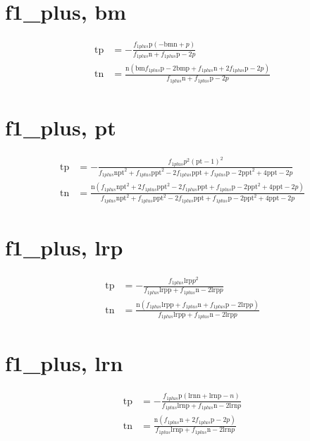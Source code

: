 \documentclass[3p,times]{elsarticle}
\begin{document}
\begin{footnotesize}
\begin{landscape}
\section{f1_plus, bm}
\begin{align}
\mathrm{tp} &= - \frac{f_{1 plus} \mathrm{p} \left(- \mathrm{bm} \mathrm{n} + p\right)}{f_{1 plus} \mathrm{n} + f_{1 plus} \mathrm{p} - 2 p}\\
\mathrm{tn} &= \frac{\mathrm{n} \left(\mathrm{bm} f_{1 plus} \mathrm{p} - 2 \mathrm{bm} \mathrm{p} + f_{1 plus} \mathrm{n} + 2 f_{1 plus} \mathrm{p} - 2 p\right)}{f_{1 plus} \mathrm{n} + f_{1 plus} \mathrm{p} - 2 p}
\end{align}
\section{f1_plus, pt}
\begin{align}
\mathrm{tp} &= - \frac{f_{1 plus} p^{2} \left(\mathrm{pt} - 1\right)^{2}}{f_{1 plus} \mathrm{n} \mathrm{pt}^{2} + f_{1 plus} \mathrm{p} \mathrm{pt}^{2} - 2 f_{1 plus} \mathrm{p} \mathrm{pt} + f_{1 plus} \mathrm{p} - 2 \mathrm{p} \mathrm{pt}^{2} + 4 \mathrm{p} \mathrm{pt} - 2 p}\\
\mathrm{tn} &= \frac{\mathrm{n} \left(f_{1 plus} \mathrm{n} \mathrm{pt}^{2} + 2 f_{1 plus} \mathrm{p} \mathrm{pt}^{2} - 2 f_{1 plus} \mathrm{p} \mathrm{pt} + f_{1 plus} \mathrm{p} - 2 \mathrm{p} \mathrm{pt}^{2} + 4 \mathrm{p} \mathrm{pt} - 2 p\right)}{f_{1 plus} \mathrm{n} \mathrm{pt}^{2} + f_{1 plus} \mathrm{p} \mathrm{pt}^{2} - 2 f_{1 plus} \mathrm{p} \mathrm{pt} + f_{1 plus} \mathrm{p} - 2 \mathrm{p} \mathrm{pt}^{2} + 4 \mathrm{p} \mathrm{pt} - 2 p}
\end{align}
\section{f1_plus, lrp}
\begin{align}
\mathrm{tp} &= - \frac{f_{1 plus} \mathrm{lrp} p^{2}}{f_{1 plus} \mathrm{lrp} \mathrm{p} + f_{1 plus} \mathrm{n} - 2 \mathrm{lrp} p}\\
\mathrm{tn} &= \frac{\mathrm{n} \left(f_{1 plus} \mathrm{lrp} \mathrm{p} + f_{1 plus} \mathrm{n} + f_{1 plus} \mathrm{p} - 2 \mathrm{lrp} p\right)}{f_{1 plus} \mathrm{lrp} \mathrm{p} + f_{1 plus} \mathrm{n} - 2 \mathrm{lrp} p}
\end{align}
\section{f1_plus, lrn}
\begin{align}
\mathrm{tp} &= - \frac{f_{1 plus} \mathrm{p} \left(\mathrm{lrn} \mathrm{n} + \mathrm{lrn} \mathrm{p} - n\right)}{f_{1 plus} \mathrm{lrn} \mathrm{p} + f_{1 plus} \mathrm{n} - 2 \mathrm{lrn} p}\\
\mathrm{tn} &= \frac{\mathrm{n} \left(f_{1 plus} \mathrm{n} + 2 f_{1 plus} \mathrm{p} - 2 p\right)}{f_{1 plus} \mathrm{lrn} \mathrm{p} + f_{1 plus} \mathrm{n} - 2 \mathrm{lrn} p}
\end{align}

\end{landscape}
\end{footnotesize}
\end{document}
